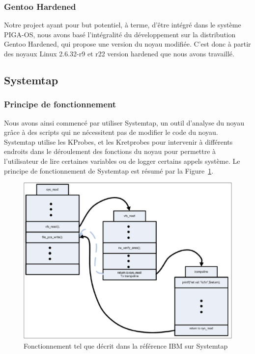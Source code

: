 \documentclass[pdftex,a4paper,titlepage,11pt]{article}
\begin{document}
\subsubsection{Gentoo Hardened}

Notre project ayant pour but potentiel, à terme, d'être intégré dans le système PIGA-OS, nous avons basé l'intégralité du développement sur la distribution Gentoo Hardened, qui propose une version du noyau modifiée. C'est donc à partir des noyaux Linux 2.6.32-r9 et r22 version hardened que nous avons travaillé.

\subsection{Systemtap}

\subsubsection{Principe de fonctionnement}

Nous avons ainsi commencé par utiliser Systemtap, un outil d'analyse du noyau grâce à des scripts qui ne nécessitent pas de modifier le code du noyau. Systemtap utilise les KProbes, et les Kretprobes\cite{IBMRBST} pour intervenir à différents endroits dans le déroulement des fonctions du noyau pour permettre à l'utilisateur de lire certaines variables ou de logger certains appels système. Le principe de fonctionnement de Systemtap est résumé par la Figure~\ref{IBMST}.

\begin{figure}[!ht]
	\centering
	\includegraphics[scale=0.4]{attachements/kretprob.png}
	\caption{Fonctionnement tel que décrit dans la référence IBM sur Systemtap \cite{IBMRBST}}
	\label{IBMST}
\end{figure}
\end{document}

